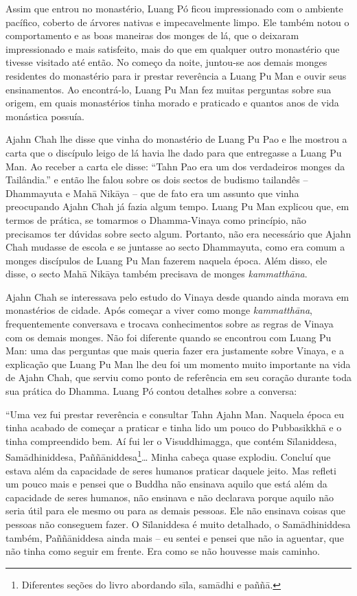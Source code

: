 Assim que entrou no monastério, Luang Pó ficou impressionado com o
ambiente pacífico, coberto de árvores nativas e impecavelmente limpo.
Ele também notou o comportamento e as boas maneiras dos monges de lá,
que o deixaram impressionado e mais satisfeito, mais do que em qualquer
outro monastério que tivesse visitado até então. No começo da noite,
juntou-se aos demais monges residentes do monastério para ir prestar
reverência a Luang Pu Man e ouvir seus ensinamentos. Ao encontrá-lo,
Luang Pu Man fez muitas perguntas sobre sua origem, em quais monastérios
tinha morado e praticado e quantos anos de vida monástica possuía.

Ajahn Chah lhe disse que vinha do monastério de Luang Pu Pao e lhe
mostrou a carta que o discípulo leigo de lá havia lhe dado para que
entregasse a Luang Pu Man. Ao receber a carta ele disse: ``Tahn Pao era
um dos verdadeiros monges da Tailândia.'' e então lhe falou sobre os
dois sectos de budismo tailandês -- Dhammayuta e Mahā Nikāya -- que de
fato era um assunto que vinha preocupando Ajahn Chah já fazia algum
tempo. Luang Pu Man explicou que, em termos de prática, se tomarmos o
Dhamma-Vinaya como princípio, não precisamos ter dúvidas sobre secto
algum. Portanto, não era necessário que Ajahn Chah mudasse de escola e
se juntasse ao secto Dhammayuta, como era comum a monges discípulos de
Luang Pu Man fazerem naquela época. Além disso, ele disse, o secto
Mahā Nikāya também precisava de monges \emph{kammatthāna}.

Ajahn Chah se interessava pelo estudo do Vinaya desde quando ainda
morava em monastérios de cidade. Após começar a viver como monge
\emph{kammatthāna}, frequentemente conversava e trocava conhecimentos
sobre as regras de Vinaya com os demais monges. Não foi diferente quando
se encontrou com Luang Pu Man: uma das perguntas que mais queria fazer
era justamente sobre Vinaya, e a explicação que Luang Pu Man lhe deu foi
um momento muito importante na vida de Ajahn Chah, que serviu como ponto
de referência em seu coração durante toda sua prática do Dhamma. Luang
Pó contou detalhes sobre a conversa:

``Uma vez fui prestar reverência e consultar Tahn Ajahn Man. Naquela
época eu tinha acabado de começar a praticar e tinha lido um pouco do
Pubbasikkhā e o tinha compreendido bem. Aí fui ler o Visuddhimagga, que
contém Sīlaniddesa, Samādhiniddesa, Paññāniddesa\footnote{Diferentes
  seções do livro abordando sīla, samādhi e paññā.}\ldots{} Minha cabeça
quase explodiu. Concluí que estava além da capacidade de seres humanos
praticar daquele jeito. Mas refleti um pouco mais e pensei que o Buddha
não ensinava aquilo que está além da capacidade de seres humanos, não
ensinava e não declarava porque aquilo não seria útil para ele mesmo ou
para as demais pessoas. Ele não ensinava coisas que pessoas não
conseguem fazer. O Sīlaniddesa é muito detalhado, o Samādhiniddesa
também, Paññāniddesa ainda mais -- eu sentei e pensei que não ia
aguentar, que não tinha como seguir em frente. Era como se não houvesse
mais caminho.

